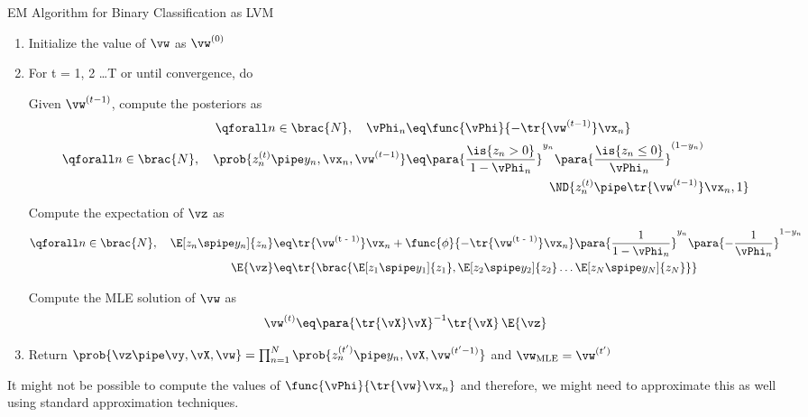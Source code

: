 \documentclass{article}
\begin{document}
\begin{question}
\begin{algo}[0.9\textwidth]{EM Algorithm for Binary Classification as LVM}
		\begin{enumerate}
			\item Initialize the value of $\vw$ as $\vw^{(0)}$
			\item For t = 1, 2 \dots T or until convergence, do
				\begin{enumerate}
					\ditem[E Step:]
						Given $\vw^{(t - 1)}$, compute the posteriors as
						\begin{align*}
							\qforall n \in \brac{N}, \quad \vPhi_n	&\eq	\func{\vPhi}{-\tr{\vw^{(t - 1)}} \vx_n} \\
							\qforall n \in \brac{N}, \quad \prob{z_n^{(t)} \pipe y_n, \vx_n, \vw^{(t - 1)}}	&\eq	\para{\frac{\is{z_n > 0}}{1 - \vPhi_n}}^{y_n} \para{\frac{\is{z_n \le 0}}{\vPhi_n}}^{(1 - y_n)} \\
							&\hspace{4cm}\ND{z_n^{(t)} \pipe \tr{\vw^{(t - 1)}} \vx_n, 1}
						\end{align*}
						Compute the expectation of $\vz$ as
						\begin{align*}
							\qforall n \in \brac{N}, \quad \E[z_n \spipe y_n]{z_n}		&\eq	\tr{\vw^{(\text{t - 1})}} \vx_n + \func{\phi}{- \tr{\vw^{(\text{t - 1})}} \vx_n} \para{\frac{1}{1 - \vPhi_n}}^{y_n} \para{-\frac{1}{\vPhi_n}}^{1 - y_n} \\
							\E{\vz}	&\eq \tr{\brac{\E[z_1 \spipe y_1]{z_1}, \E[z_2 \spipe y_2]{z_2} \dots \E[z_N \spipe y_N]{z_N}}}
						\end{align*}
					\ditem[M Step:]

						Compute the MLE solution of $\vw$ as
						\begin{align*}
							\vw^{(t)}	\eq	\para{\tr{\vX} \vX}^{-1} \tr{\vX}\,\E{\vz}
						\end{align*}
				\end{enumerate}
			\item Return $\prob{\vz \pipe \vy, \vX, \vw} = \prod_{n = 1}^N \prob{z_n^{(t')} \pipe y_n, \vX, \vw^{(t' - 1)}}$ and $\vw_{\text{MLE}} = \vw^{(t')}$
		\end{enumerate}

	\end{algo}

	\begin{note}
		It might not be possible to compute the values of $\func{\vPhi}{\tr{\vw} \vx_n}$ and therefore, we might need to approximate this as well using standard approximation techniques.
	\end{note}

\end{question}
\end{document}
